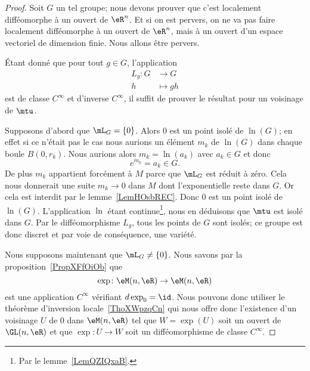 \begin{proof}
	Soit \( G\) un tel groupe; nous devons prouver que c'est localement difféomorphe à un ouvert de \( \eR^n\). Et si on est pervers, on ne va pas faire localement difféomorphe à un ouvert de \( \eR^n\), mais à un ouvert d'un espace vectoriel de dimension finie. Nous allons être pervers.

	Étant donné que pour tout \( g\in G\), l'application
	\begin{equation}
		\begin{aligned}
			L_g\colon G & \to G      \\
			h           & \mapsto gh
		\end{aligned}
	\end{equation}
	est de classe \(  C^{\infty}\) et d'inverse \(  C^{\infty}\), il suffit de prouver le résultat pour un voisinage de \( \mtu\).

	Supposons d'abord que \( \mL_G=\{ 0 \}\). Alors \( 0\) est un point isolé de \( \ln(G)\); en effet si ce n'était pas le cas nous aurions un élément \( m_k\) de \( \ln(G)\) dans chaque boule \( B(0,r_k)\). Nous aurions alors \( m_k=\ln(a_k)\) avec \( a_k\in G\) et donc
	\begin{equation}
		e^{m_k}=a_k\in G.
	\end{equation}
	De plus \( m_k\) appartient forcément à \( M\) parce que \( \mL_G\) est réduit à zéro. Cela nous donnerait une suite \( m_k\to 0\) dans \( M\) dont l'exponentielle reste dans \( G\). Or cela est interdit par le lemme~\ref{LemHOsbREC}. Donc \( 0\) est un point isolé de \( \ln(G)\). L'application \(\ln\) étant continue\footnote{Par le lemme~\ref{LemQZIQxaB}.}, nous en déduisons que \( \mtu\) est isolé dans \( G\). Par le difféomorphisme \( L_g\), tous les points de \( G\) sont isolés; ce groupe est donc discret et par voie de conséquence, une variété.

	Nous supposons maintenant que \( \mL_G\neq\{ 0 \}\). Nous savons par la proposition~\ref{PropXFfOiOb} que
	\begin{equation}
		\exp\colon \eM(n,\eR)\to \eM(n,\eR)
	\end{equation}
	est une application \(  C^{\infty}\) vérifiant \( d\exp_0=\id\). Nous pouvons donc utiliser le théorème d'inversion locale~\ref{ThoXWpzqCn} qui nous offre donc l'existence d'un voisinage \( U\) de \( 0\) dans \( \eM(n,\eR)\) tel que \( W=\exp(U)\) soit un ouvert de \( \GL(n,\eR)\) et que \( \exp\colon U\to W\) soit un difféomorphisme de classe \(  C^{\infty}\).


\end{proof}

